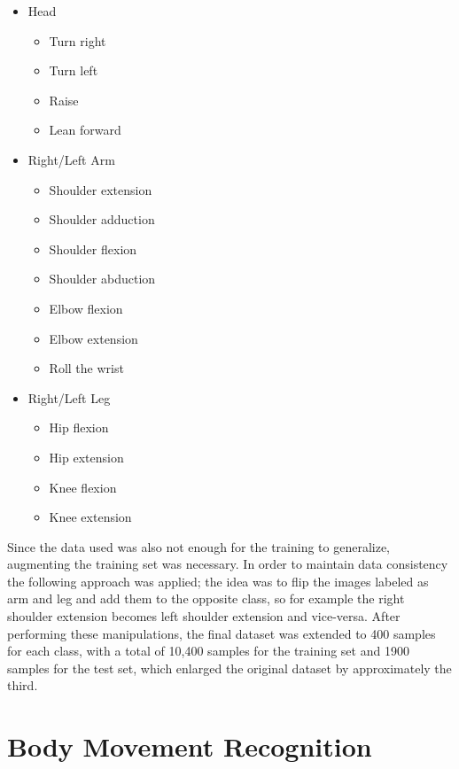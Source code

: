 \documentclass{article}
\begin{document}
\begin{itemize}
	\item Head
		\begin{itemize}
			\item Turn right
			\item Turn left
			\item Raise
			\item Lean forward
		\end{itemize}
	\item Right/Left Arm
		\begin{itemize}
			\item Shoulder extension
			\item Shoulder adduction
			\item Shoulder flexion
			\item Shoulder abduction
			\item Elbow flexion
			\item Elbow extension
			\item Roll the wrist
		\end{itemize}
	\item Right/Left Leg
		\begin{itemize}
			\item Hip flexion
			\item Hip extension
			\item Knee flexion
			\item Knee extension
		\end{itemize}
\end{itemize}

Since the data used was also not enough for the training to generalize, augmenting the training set was necessary. In order to maintain data consistency the following approach was applied; the idea was to flip the images labeled as arm and leg and add them to the opposite class, so for example the right shoulder extension becomes left shoulder extension and vice-versa. After performing these manipulations, the final dataset was extended to 400 samples for each class, with a total of 10,400 samples for the training set and 1900 samples for the test set, which enlarged the original dataset by approximately the third.


\section{Body Movement Recognition}
\end{document}

